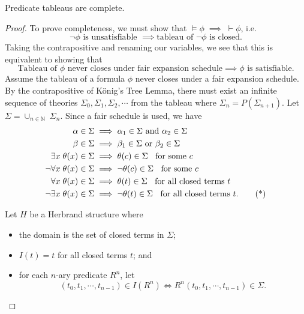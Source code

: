 \begin{theorem}
    Predicate tableaus are complete.
\end{theorem}
\begin{proof}
    To prove completeness, we must show that \(\models\phi\;\implies\;\vdash\phi\), i.e.
    \[\neg\phi \text{ is unsatisfiable } \implies \text{tableau of } \neg\phi \text{ is closed.}\]
    Taking the contrapositive and renaming our variables, we see that this is equivalent to showing that
    \[\text{Tableau of } \phi \text{ never closes under fair expansion schedule} \implies \phi \text{ is satisfiable.}\]
    Assume the tableau of a formula \(\phi\) never closes under a fair expansion schedule. By the contrapositive of König's Tree Lemma, there must exist an infinite sequence of theories \(\Sigma_0, \Sigma_1, \Sigma_2, \cdots\) from the tableau where \(\Sigma_n = P(\Sigma_{n+1})\). Let \(\Sigma = \cup_{n\in\mathbb{N}}\; \Sigma_n\). Since a fair schedule is used, we have
    \begin{align*}
        \alpha \in \Sigma &\implies \alpha_1 \in \Sigma \text{ and } \alpha_2 \in \Sigma\\
        \beta \in \Sigma &\implies \beta_1 \in \Sigma \text{ or } \beta_2 \in \Sigma\\
        \exists x\; \theta(x) \in \Sigma &\implies \theta(c) \in \Sigma \text{\;\; for some } c\\
        \neg\forall x\; \theta(x) \in \Sigma &\implies \neg\theta(c) \in \Sigma \text{\;\; for some } c\\
        \forall x\; \theta(x) \in \Sigma &\implies \theta(t) \in \Sigma \text{\;\; for all closed terms } t\\
        \neg\exists x\; \theta(x) \in \Sigma &\implies \neg\theta(t) \in \Sigma \text{\;\; for all closed terms } t\text{.} \label{eq:Ch05-fair-schedule-consequence}\tag{*}
    \end{align*}

    Let \(H\) be a Herbrand structure where
    \begin{itemize}
        \item the domain is the set of closed terms in \(\Sigma\);
        \item \(I(t) = t\) for all closed terms \(t\); and
        \item for each \(n\)-ary predicate \(R^n\), let
        \[(t_0, t_1, \cdots, t_{n-1}) \in I(R^n) \iff R^n (t_0, t_1, \cdots, t_{n-1}) \in \Sigma\text{.}\]
    \end{itemize}


\end{proof}
